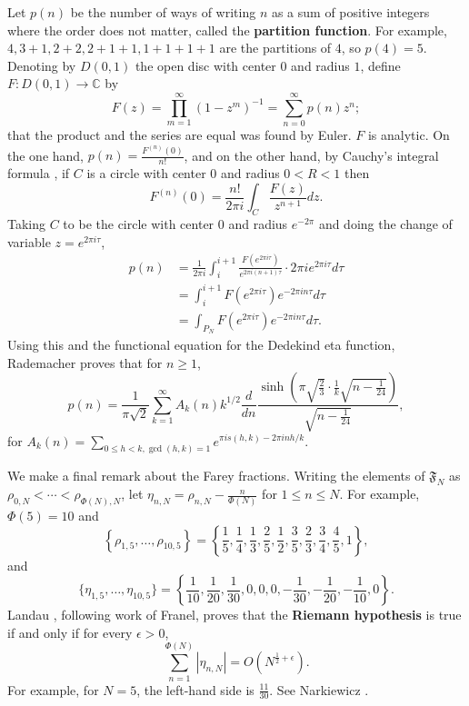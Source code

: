 \documentclass{amsart}
\begin{document}
Let $p(n)$ be the number of ways of writing $n$ as a sum of positive integers where the order does not matter, called the
\textbf{partition function}. For example, $4,3+1,2+2,2+1+1,1+1+1+1$ are the partitions of $4$, so $p(4)=5$. 
Denoting by $D(0,1)$ the open disc with center $0$ and radius $1$, define $F:D(0,1) \to \mathbb{C}$ by
\[
F(z) = \prod_{m=1}^\infty (1-z^m)^{-1} =  \sum_{n=0}^\infty p(n) z^n;
\]
that the product and the  series are equal was found by Euler.
$F$ is analytic. On the one hand, $p(n) =\frac{F^{(n)}(0)}{n!} $, and on the other hand, by Cauchy's integral formula  \cite[p.~82, Theorem 2.41]{titchmarsh}, if $C$ is a circle with center $0$ and radius $0<R<1$ then 
\[
F^{(n)}(0) = \frac{n!}{2\pi i} \int_C \frac{F(z)}{z^{n+1}} dz.
\]
Taking $C$ to be the circle with center $0$ and
radius $e^{-2\pi}$ and doing the change of variable $z = e^{2\pi i\tau}$, 
\begin{align*}
p(n) & = \frac{1}{2\pi i} \int_i^{i+1} \frac{F(e^{2\pi i\tau})}{e^{2\pi i (n+1)\tau}} \cdot 2\pi i e^{2\pi i\tau}
d\tau\\
&=\int_i^{i+1} F(e^{2\pi i\tau}) e^{-2\pi in\tau} d\tau\\
&=\int_{P_N} F(e^{2\pi i\tau}) e^{-2\pi in\tau} d\tau.
\end{align*}
Using this and the functional equation for the Dedekind eta function, 
Rademacher \cite[p.~104, Theorem 5.10]{apostol} proves that for $n \geq 1$,
\[
p(n) = \frac{1}{\pi \sqrt{2}} \sum_{k=1}^\infty A_k(n) k^{1/2} \frac{d}{dn}  \frac{ \sinh \left( \pi \sqrt{\frac{2}{3}} \cdot \frac{1}{k} \sqrt{n-\frac{1}{24}}\right)}{\sqrt{n-\frac{1}{24}}},
\]
for $A_k(n) = \sum_{0 \leq h < k, \gcd(h,k)=1} e^{\pi i s(h,k) - 2\pi inh/k}$.


We make a final remark about the Farey fractions. Writing the elements of $\mathfrak{F}_N$ as $\rho_{0,N}<\cdots<\rho_{\Phi(N),N}$,
 let $\eta_{n,N} = \rho_{n,N} - \frac{n}{\Phi(N)}$ for $1 \leq n \leq N$. 
For example,  $\Phi(5)=10$ and
\[
\left\{\rho_{1,5},\ldots,\rho_{10,5}\right\}=
 \left\{\frac{1}{5},\frac{1}{4},\frac{1}{3},\frac{2}{5},\frac{1}{2},\frac{3}{5},\frac{2}{3},\frac{3}{4},\frac{4}{5},1\right\},
\]
and 
\[
\{\eta_{1,5},\ldots,\eta_{10,5}\} = \left\{\frac{1}{10},\frac{1}{20},\frac{1}{30},0,0,0,-\frac{1}{30},
-\frac{1}{20},-\frac{1}{10},0\right\}.
\]
Landau \cite{farey}, following work of Franel, proves that the \textbf{Riemann hypothesis} is true if and only if
for every $\epsilon>0$,
\[
\sum_{n=1}^{\Phi(N)} |\eta_{n,N}| = O(N^{\frac{1}{2}+\epsilon}).
\]
For example, 
for $N=5$, the left-hand side is $\frac{11}{30}$. 
See Narkiewicz \cite[p.~40, \S 2.2.3]{narkiewicz}.
\end{document}
